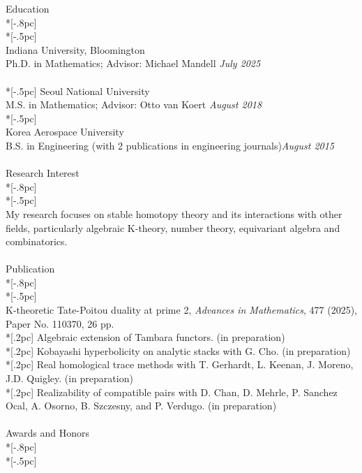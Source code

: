 \documentclass{article}
\begin{document}
{\Large  Education} \\*[-.8pc]
\underline{\hspace{6.5in}} \\*[-.5pc]
\\
{ Indiana University, Bloomington}\\ 
{Ph.D. in Mathematics; Advisor: Michael Mandell} \hfill {\it  July 2025} \\
\\*[-.5pc]
{ Seoul National University} \\ 
{M.S. in Mathematics; Advisor: Otto van Koert} \hfill{\it August 2018 } \\*[-.5pc]
\\
{ Korea Aerospace University} \\
{B.S. in Engineering (with 2 publications in engineering journals)}\hfill{\it August 2015}\\
\\
{\Large  Research Interest} \\*[-.8pc]
\underline{\hspace{6.5in}} \\*[-.5pc]
\\
My research focuses on stable homotopy theory and its interactions with other fields, particularly algebraic K-theory, number theory, equivariant algebra and combinatorics.
\\
\\
{\Large  Publication} \\*[-.8pc]
\underline{\hspace{6.5in}} \\*[-.5pc]
\\
{K-theoretic Tate-Poitou duality at prime 2}, {\it Advances in Mathematics}, 477 (2025), Paper No. 110370, 26 pp. \\*[.2pc]
{Algebraic extension of Tambara functors}. (in preparation)\\*[.2pc]
{Kobayashi hyperbolicity on analytic stacks} with G. Cho. (in preparation)\\*[.2pc]
{Real homological trace methods} with T. Gerhardt, L. Keenan, J. Moreno, J.D. Quigley. (in preparation)\\*[.2pc]
{Realizability of compatible pairs} with D. Chan, D. Mehrle, P. Sanchez Ocal, A. Osorno, B. Szczesny, and P. Verdugo. (in preparation)\\
\\ 
{\Large  Awards and Honors} \\*[-.8pc]
\underline{\hspace{6.5in}} \\*[-.5pc]
\end{document}
